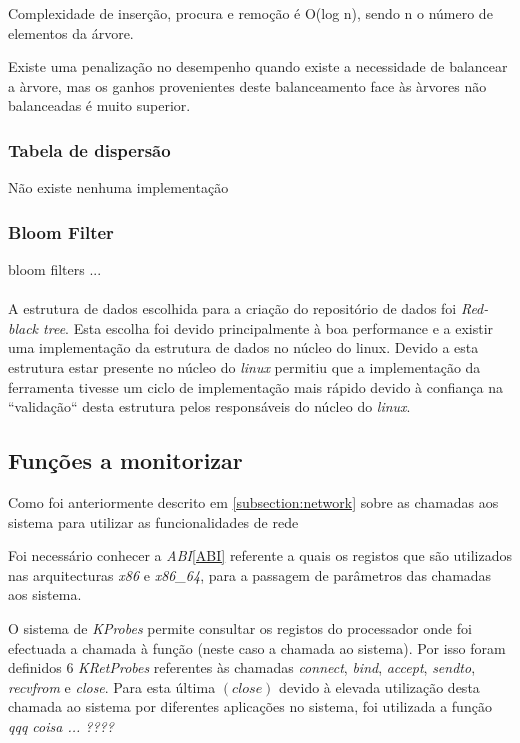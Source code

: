 Complexidade de inserção, procura e remoção é O(log n), sendo n o número de
elementos da árvore.

Existe uma penalização no desempenho quando existe a necessidade de balancear a àrvore, mas os ganhos provenientes deste balanceamento face às àrvores não balanceadas é muito superior.

\subsubsection{Tabela de dispersão}
Não existe nenhuma implementação 

\subsubsection{Bloom Filter}
bloom filters ...

\paragraph*{}
A estrutura de dados escolhida para a criação do repositório de dados foi
\textit{Red-black tree}. Esta escolha foi devido principalmente à boa
performance e a existir uma implementação da estrutura de dados no núcleo do
linux. Devido a esta estrutura estar presente no núcleo do \textit{linux}
permitiu que a implementação da ferramenta tivesse um ciclo de implementação
mais rápido devido à confiança na ``validação`` desta estrutura pelos
responsáveis do núcleo do \textit{linux}.

\subsection{Funções a monitorizar}

Como foi anteriormente descrito em \ref{subsection:network} sobre as chamadas
aos sistema para utilizar as funcionalidades de rede

Foi necessário conhecer a \textit{ABI}\ref{ABI}\cite{ABI} referente a quais os
registos que são utilizados nas arquitecturas \textit{x86} e \textit{x86\_64},
para a passagem de parâmetros das chamadas aos sistema.

O sistema de \textit{KProbes} permite consultar os registos do processador onde
foi efectuada a chamada à função (neste caso a chamada ao sistema). Por isso
foram definidos 6 \textit{KRetProbes} referentes às chamadas \textit{connect},
\textit{bind}, \textit{accept}, \textit{sendto}, \textit{recvfrom} e
\textit{close}. Para esta última $\left( \textit{close} \right)$ devido à
elevada utilização desta chamada ao sistema por diferentes aplicações no
sistema, foi utilizada a função \textit{qqq coisa ...  ????}

